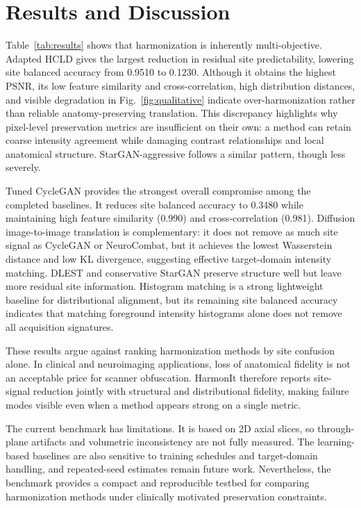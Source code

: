 \documentclass{article}
\begin{document}
\section{Results and Discussion}
Table~\ref{tab:results} shows that harmonization is inherently multi-objective. Adapted HCLD gives the largest reduction in residual site predictability, lowering site balanced accuracy from 0.9510 to 0.1230. Although it obtains the highest PSNR, its low feature similarity and cross-correlation, high distribution distances, and visible degradation in Fig.~\ref{fig:qualitative} indicate over-harmonization rather than reliable anatomy-preserving translation. This discrepancy highlights why pixel-level preservation metrics are insufficient on their own: a method can retain coarse intensity agreement while damaging contrast relationships and local anatomical structure. StarGAN-aggressive follows a similar pattern, though less severely.

Tuned CycleGAN provides the strongest overall compromise among the completed baselines. It reduces site balanced accuracy to 0.3480 while maintaining high feature similarity (0.990) and cross-correlation (0.981). Diffusion image-to-image translation is complementary: it does not remove as much site signal as CycleGAN or NeuroCombat, but it achieves the lowest Wasserstein distance and low KL divergence, suggesting effective target-domain intensity matching. DLEST and conservative StarGAN preserve structure well but leave more residual site information. Histogram matching is a strong lightweight baseline for distributional alignment, but its remaining site balanced accuracy indicates that matching foreground intensity histograms alone does not remove all acquisition signatures.

These results argue against ranking harmonization methods by site confusion alone. In clinical and neuroimaging applications, loss of anatomical fidelity is not an acceptable price for scanner obfuscation. HarmonIt therefore reports site-signal reduction jointly with structural and distributional fidelity, making failure modes visible even when a method appears strong on a single metric.

The current benchmark has limitations. It is based on 2D axial slices, so through-plane artifacts and volumetric inconsistency are not fully measured. The learning-based baselines are also sensitive to training schedules and target-domain handling, and repeated-seed estimates remain future work. Nevertheless, the benchmark provides a compact and reproducible testbed for comparing harmonization methods under clinically motivated preservation constraints.
\end{document}
